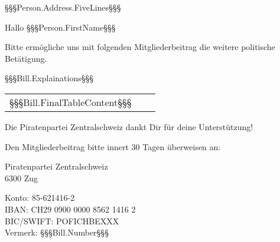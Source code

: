 ﻿\documentclass[ppsletter,fontsize=11pt,foldmarks=false ]{scrlttr2}
\begin{document}


\begin{letter}{%
    §§§Person.Address.FiveLines§§§
}

\enlargethispage{10cm}

\opening{Hallo §§§Person.FirstName§§§}

Bitte ermögliche uns mit folgenden Mitgliederbeitrag die weitere politische Betätigung.

\vspace{0.2cm}

§§§Bill.Explainations§§§

\vspace{0.2cm}

\begin{tabular}{ l r r }
§§§Bill.FinalTableContent§§§
\end{tabular}

\vspace{0.2cm}

Die Piratenpartei Zentralschweiz dankt Dir für deine Unterstützung!

\vspace{1cm}
Den Mitgliederbeitrag bitte innert 30 Tagen überweisen an:

Piratenpartei Zentralschweiz \\
6300 Zug

Konto: 85-621416-2 \\
IBAN: CH29 0900 0000 8562 1416 2 \\
BIC/SWIFT: POFICHBEXXX \\
Vermerk: §§§Bill.Number§§§

\end{letter}%
\end{document}
